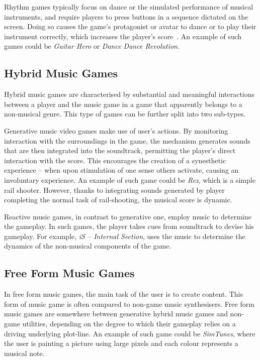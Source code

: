 Rhythm games typically focus on dance or the simulated performance of musical instruments, and require players to press buttons in a sequence dictated on the screen. Doing so causes the game's protagonist or avatar to dance or to play their instrument correctly, which increases the player's score~\cite{rhythmgame}. An example of such games could be \textit{Guitar Hero} or \textit{Dance Dance Revolution}.

\vspace{10pt}


\subsection{Hybrid Music Games}

Hybrid music games are characterised by substantial and meaningful interactions between a player and the music game in a game that apparently belongs to a non-musical genre. This type of games can be further split into two sub-types.


Generative music video games make use of user’s actions. By monitoring interaction with the surroundings in the game, the mechanism generates sounds that are then integrated into the soundtrack, permitting the player’s direct interaction with the score. This encourages the creation of a synesthetic experience -- when upon stimulation of one sense others activate, causing an involuntary experience. An example of such game could be \textit{Rez}, which is a simple rail shooter. However, thanks to integrating sounds generated by player completing the normal task of rail-shooting, the musical score is dynamic.

Reactive music games, in contrast to generative one, employ music to determine the gameplay. In such games, the player takes cues from soundtrack to devise his gameplay. For example, \textit{iS -- Internal Section}, uses the music to determine the dynamics of the non-musical components of the game.

\vspace{10pt}


\subsection{Free Form Music Games}

In free form music games, the main task of the user is to create content. This form of music game is often compared to non-game music synthesisers. Free form music games are somewhere between generative hybrid music games and non-game utilities, depending on the degree to which their gameplay relies on a driving underlying plot-line. An example of such game could be \textit{SimTunes}, where the user is painting a picture using large pixels and each colour represents a musical note. 

